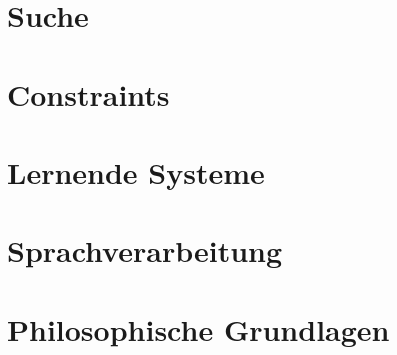 \documentclass[11pt,fleqn]{book} %
\begin{document}
\part{Suche}



\part{Constraints}

\part{Lernende Systeme}

\part{Sprachverarbeitung}

\part{Philosophische Grundlagen}
\end{document}
